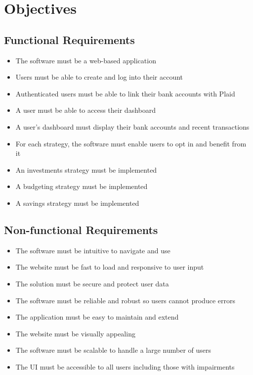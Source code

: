 \section{Objectives}

\subsection{Functional Requirements}
\begin{itemize}
	\item The software must be a web-based application
	\item Users must be able to create and log into their account
	\item Authenticated users must be able to link their bank accounts with Plaid
	\item A user must be able to access their dashboard
	\item A user's dashboard must display their bank accounts and recent transactions
	\item For each strategy, the software must enable users to opt in and benefit from it 
	\item An investments strategy must be implemented \cite{InvestBook}
	\item A budgeting strategy must be implemented \cite{BudgettingBook}
	\item A savings strategy must be implemented \cite{MoneyBook}
\end{itemize}

\subsection{Non-functional Requirements}
\begin{itemize}
	\item The software must be intuitive to navigate and use
	\item The website must be fast to load and responsive to user input
	\item The solution must be secure and protect user data
	\item The software must be reliable and robust so users cannot produce errors
	\item The application must be easy to maintain and extend
	\item The website must be visually appealing
	\item The software must be scalable to handle a large number of users
	\item The UI must be accessible to all users including those with impairments
\end{itemize}


